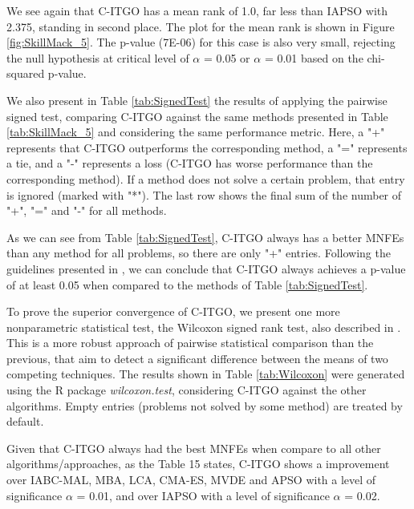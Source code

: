 We see again that C-ITGO has a mean rank of 1.0, far less than IAPSO with 2.375, standing in second place. The plot for the mean rank is shown in Figure \ref{fig:SkillMack_5}. The p-value (7E-06) for this case is also very small, rejecting the null hypothesis at critical level of $\alpha$ = 0.05 or $\alpha$ = 0.01 based on the chi-squared p-value.


We also present in Table \ref{tab:SignedTest} the results of applying the pairwise signed test, comparing C-ITGO against the same methods presented in Table \ref{tab:SkillMack_5} and considering the same performance metric. Here, a "+" represents that C-ITGO outperforms the corresponding method, a "=" represents a tie, and a "-" represents a loss (C-ITGO has worse performance than the corresponding method). If a method does not solve a certain problem, that entry is ignored (marked with "*"). The last row shows the final sum of the number of "+", "=" and "-" for all methods.

As we can see from Table \ref{tab:SignedTest}, C-ITGO always has a better MNFEs than any method for all problems, so there are only "+" entries. Following the guidelines presented in \cite{Friedman}, we can conclude that C-ITGO always achieves a p-value of at least 0.05 when compared to the methods of Table \ref{tab:SignedTest}.




To prove the superior convergence of C-ITGO, we present one more nonparametric statistical test, the Wilcoxon signed rank test, also described in \cite{Friedman}. This is a more robust approach of pairwise statistical comparison than the previous, that aim to detect a significant difference between the means of two competing techniques. The results shown in Table \ref{tab:Wilcoxon} were generated using the R package \textit{wilcoxon.test}, considering C-ITGO against the other algorithms. Empty entries (problems not solved by some method) are treated by default.




Given that C-ITGO always had the best MNFEs when compare to all other algorithms/approaches, as the Table 15 states, C-ITGO shows a improvement over IABC-MAL, MBA, LCA, CMA-ES, MVDE and APSO  with a level of significance $\alpha$ = 0.01, and over IAPSO with a level of significance $\alpha$ = 0.02.